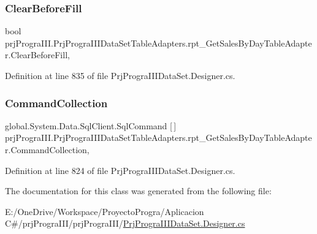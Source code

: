 \subsubsection{\texorpdfstring{Clear\+Before\+Fill}{ClearBeforeFill}}
{\footnotesize\ttfamily bool prj\+Progra\+I\+I\+I.\+Prj\+Progra\+I\+I\+I\+Data\+Set\+Table\+Adapters.\+rpt\+\_\+\+Get\+Sales\+By\+Day\+Table\+Adapter.\+Clear\+Before\+Fill\hspace{0.3cm}{\ttfamily [get]}, {\ttfamily [set]}}



Definition at line 835 of file Prj\+Progra\+I\+I\+I\+Data\+Set.\+Designer.\+cs.

\hypertarget{classprj_progra_i_i_i_1_1_prj_progra_i_i_i_data_set_table_adapters_1_1rpt___get_sales_by_day_table_adapter_ac4bcf7387f0c5a745fe16d6b4993d44f}{}\label{classprj_progra_i_i_i_1_1_prj_progra_i_i_i_data_set_table_adapters_1_1rpt___get_sales_by_day_table_adapter_ac4bcf7387f0c5a745fe16d6b4993d44f} 
\subsubsection{\texorpdfstring{Command\+Collection}{CommandCollection}}
{\footnotesize\ttfamily global.\+System.\+Data.\+Sql\+Client.\+Sql\+Command \mbox{[}$\,$\mbox{]} prj\+Progra\+I\+I\+I.\+Prj\+Progra\+I\+I\+I\+Data\+Set\+Table\+Adapters.\+rpt\+\_\+\+Get\+Sales\+By\+Day\+Table\+Adapter.\+Command\+Collection\hspace{0.3cm}{\ttfamily [get]}, {\ttfamily [protected]}}



Definition at line 824 of file Prj\+Progra\+I\+I\+I\+Data\+Set.\+Designer.\+cs.



The documentation for this class was generated from the following file\+:\begin{DoxyCompactItemize}
\item 
E\+:/\+One\+Drive/\+Workspace/\+Proyecto\+Progra/\+Aplicacion C\#/prj\+Progra\+I\+I\+I/prj\+Progra\+I\+I\+I/\hyperlink{_prj_progra_i_i_i_data_set_8_designer_8cs}{Prj\+Progra\+I\+I\+I\+Data\+Set.\+Designer.\+cs}\end{DoxyCompactItemize}
